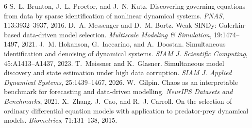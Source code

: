 \documentclass[letterpaper,10pt,twocolumn]{article}
\begin{document}
\begin{thebibliography}{6}
\small
{} S.~L. Brunton, J.~L. Proctor, and J.~N. Kutz. Discovering governing equations from data by sparse identification of nonlinear dynamical systems. \emph{PNAS}, 113:3932--3937, 2016.
 D.~A. Messenger and D.~M. Bortz. Weak SINDy: Galerkin-based data-driven model selection. \emph{Multiscale Modeling \& Simulation}, 19:1474--1497, 2021.
 J.~M. Hokanson, G.~Iaccarino, and A.~Doostan. Simultaneous identification and denoising of dynamical systems. \emph{SIAM J. Scientific Computing}, 45:A1413--A1437, 2023.
 T.~Meissner and K.~Glasner. Simultaneous model discovery and state estimation under high data corruption. \emph{SIAM J. Applied Dynamical Systems}, 25:1439--1467, 2026.
 W.~Gilpin. Chaos as an interpretable benchmark for forecasting and data-driven modelling. \emph{NeurIPS Datasets and Benchmarks}, 2021.
 X.~Zhang, J.~Cao, and R.~J. Carroll. On the selection of ordinary differential equation models with application to predator-prey dynamical models. \emph{Biometrics}, 71:131--138, 2015.
\end{thebibliography}
\end{document}
